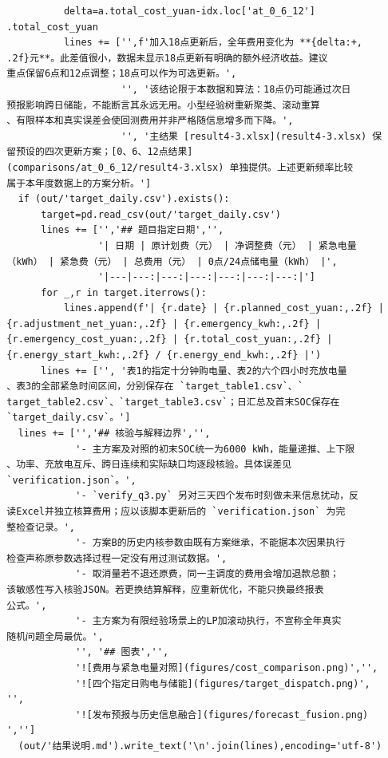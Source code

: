 \begin{verbatim}
            delta=a.total_cost_yuan-idx.loc['at_0_6_12']
  .total_cost_yuan
            lines += ['',f'加入18点更新后，全年费用变化为 **{delta:+,
  .2f}元**。此差值很小，数据未显示18点更新有明确的额外经济收益。建议
  重点保留6点和12点调整；18点可以作为可选更新。',
                      '', '该结论限于本数据和算法：18点仍可能通过次日
  预报影响跨日储能，不能断言其永远无用。小型经验树重新聚类、滚动重算
  、有限样本和真实误差会使回测费用并非严格随信息增多而下降。',
                      '', '主结果 [result4-3.xlsx](result4-3.xlsx) 保
  留预设的四次更新方案；[0、6、12点结果]
  (comparisons/at_0_6_12/result4-3.xlsx) 单独提供。上述更新频率比较
  属于本年度数据上的方案分析。']
    if (out/'target_daily.csv').exists():
        target=pd.read_csv(out/'target_daily.csv')
        lines += ['','## 题目指定日期','',
                  '| 日期 | 原计划费（元） | 净调整费（元） | 紧急电量
  （kWh） | 紧急费（元） | 总费用（元） | 0点/24点储电量（kWh） |',
                  '|---|---:|---:|---:|---:|---:|---:|']
        for _,r in target.iterrows():
            lines.append(f'| {r.date} | {r.planned_cost_yuan:,.2f} |
  {r.adjustment_net_yuan:,.2f} | {r.emergency_kwh:,.2f} |
  {r.emergency_cost_yuan:,.2f} | {r.total_cost_yuan:,.2f} |
  {r.energy_start_kwh:,.2f} / {r.energy_end_kwh:,.2f} |')
        lines += ['', '表1的指定十分钟购电量、表2的六个四小时充放电量
  、表3的全部紧急时间区间，分别保存在 `target_table1.csv`、`
  target_table2.csv`、`target_table3.csv`；日汇总及首末SOC保存在
  `target_daily.csv`。']
    lines += ['','## 核验与解释边界','',
              '- 主方案及对照的初末SOC统一为6000 kWh，能量递推、上下限
  、功率、充放电互斥、跨日连续和实际缺口均逐段核验。具体误差见
  `verification.json`。',
              '- `verify_q3.py` 另对三天四个发布时刻做未来信息扰动，反
  读Excel并独立核算费用；应以该脚本更新后的 `verification.json` 为完
  整检查记录。',
              '- 方案B的历史内核参数由既有方案继承，不能据本次因果执行
  检查声称原参数选择过程一定没有用过测试数据。',
              '- 取消量若不退还原费，同一主调度的费用会增加退款总额；
  该敏感性写入核验JSON。若更换结算解释，应重新优化，不能只换最终报表
  公式。',
              '- 主方案为有限经验场景上的LP加滚动执行，不宣称全年真实
  随机问题全局最优。',
              '', '## 图表','',
              '![费用与紧急电量对照](figures/cost_comparison.png)','',
              '![四个指定日购电与储能](figures/target_dispatch.png)',
  '',
              '![发布预报与历史信息融合](figures/forecast_fusion.png)
  ','']
    (out/'结果说明.md').write_text('\n'.join(lines),encoding='utf-8')



\end{verbatim}
